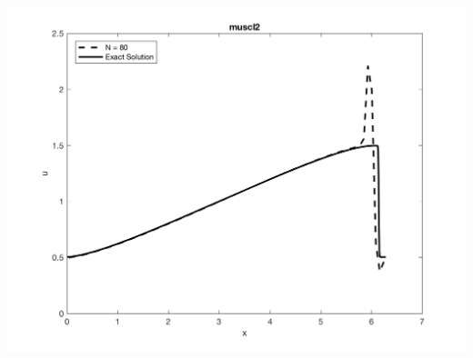 \documentclass[11pt, oneside]{article}
\begin{document}
\begin{enumerate}
\begin{enumerate}
\begin{center}
          \includegraphics[scale=0.5]{Figures/06_03.png}
        \end{center}
    \end{enumerate}


\end{enumerate}
\end{document}
